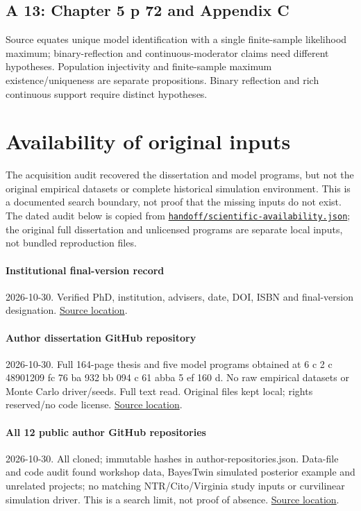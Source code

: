 \documentclass[11pt]{article}
\newcommand{\file}[1]{\href{https://github.com/alectionary/vibe-math/blob/master/formalization/schwabe-psychometric-genetics/#1}{\nolinkurl{#1}}}
\begin{document}
\subsection{A 13: Chapter 5 p 72 and Appendix C}
Source equates unique model identification with a single finite-sample likelihood maximum; binary-reflection and continuous-moderator claims need different hypotheses. Population injectivity and finite-sample maximum existence/uniqueness are separate propositions. Binary reflection and rich continuous support require distinct hypotheses.
\section{Availability of original inputs}\label{sec:availability}
The acquisition audit recovered the dissertation and model programs, but not the original empirical datasets or complete historical simulation environment. This is a documented search boundary, not proof that the missing inputs do not exist. The dated audit below is copied from \file{handoff/scientific-availability.json}; the original full dissertation and unlicensed programs are separate local inputs, not bundled reproduction files.
\paragraph{Institutional final-version record} 2026-10-30. Verified PhD, institution, advisers, date, DOI, ISBN and final-version designation. \href{https://research.utwente.nl/en/publications/nature-nurture-and-item-response-theory-a-psychometric-approach-t/}{Source location}.
\paragraph{Author dissertation GitHub repository} 2026-10-30. Full 164-page thesis and five model programs obtained at 6 c 2 c 48901209 fc 76 ba 932 bb 094 c 61 abba 5 ef 160 d. No raw empirical datasets or Monte Carlo driver/seeds. Full text read. Original files kept local; rights reserved/no code license. \href{https://github.com/ingaschwabe/Nature-Nurture-and-Item-Response-Theory}{Source location}.
\paragraph{All 12 public author GitHub repositories} 2026-10-30. All cloned; immutable hashes in author-repositories.json. Data-file and code audit found workshop data, BayesTwin simulated posterior example and unrelated projects; no matching NTR/Cito/Virginia study inputs or curvilinear simulation driver. This is a search limit, not proof of absence. \href{https://github.com/ingaschwabe}{Source location}.
\end{document}
